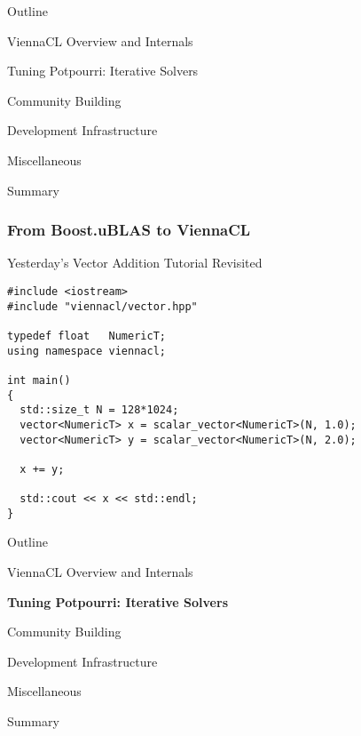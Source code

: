

%
%

\begin{frame}{Outline}
 \begin{block}{ViennaCL Overview and Internals}\end{block}
 \begin{block}{Tuning Potpourri: Iterative Solvers}\end{block}
 \begin{block}{Community Building}\end{block}
 \begin{block}{Development Infrastructure}\end{block}
 \begin{block}{Miscellaneous}\end{block}
 \begin{block}{Summary}\end{block}
\end{frame}




\begin{frame}[fragile]
\frametitle{From Boost.uBLAS to ViennaCL}
\begin{block}{Yesterday's Vector Addition Tutorial Revisited}
  \begin{lstlisting}
#include <iostream>
#include "viennacl/vector.hpp"

typedef float   NumericT;
using namespace viennacl;

int main()
{
  std::size_t N = 128*1024;
  vector<NumericT> x = scalar_vector<NumericT>(N, 1.0);
  vector<NumericT> y = scalar_vector<NumericT>(N, 2.0);

  x += y;

  std::cout << x << std::endl;
}
  \end{lstlisting} 
\end{block}

\end{frame}







\begin{frame}{Outline}
 \begin{block}{ViennaCL Overview and Internals}\end{block}
 \begin{block}{\textbf{Tuning Potpourri: Iterative Solvers}}\end{block}
 \begin{block}{Community Building}\end{block}
 \begin{block}{Development Infrastructure}\end{block}
 \begin{block}{Miscellaneous}\end{block}
 \begin{block}{Summary}\end{block}
\end{frame}


